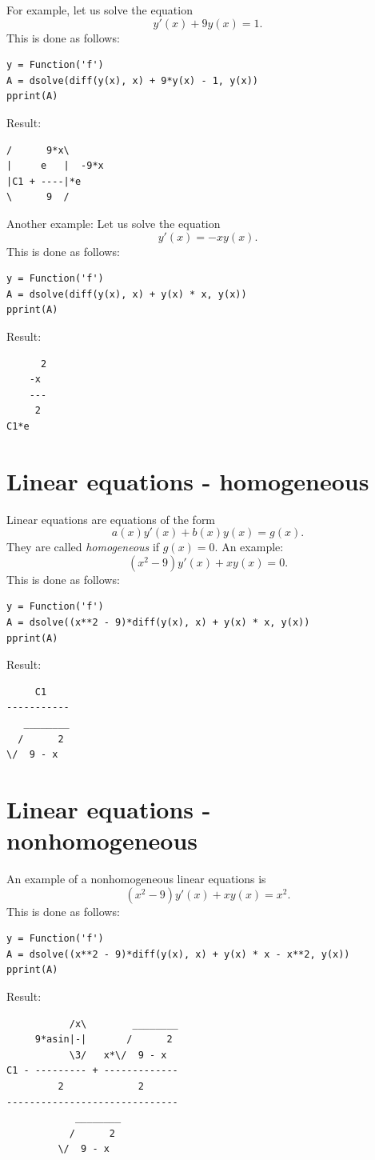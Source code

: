 \documentclass[article,A4,12pt]{llncs}
\begin{document}
For example, let us solve the equation 
$$
  y'(x) + 9y(x) = 1.
$$
This is done as follows:
\begin{verbatim}
y = Function('f')
A = dsolve(diff(y(x), x) + 9*y(x) - 1, y(x))
pprint(A)
\end{verbatim}
Result:
\begin{verbatim}
/      9*x\      
|     e   |  -9*x
|C1 + ----|*e    
\      9  /    
\end{verbatim}
Another example: Let us solve the equation 
$$
  y'(x) = -xy(x).
$$
This is done as follows:
\begin{verbatim}
y = Function('f')
A = dsolve(diff(y(x), x) + y(x) * x, y(x))
pprint(A)
\end{verbatim}
Result:
\begin{verbatim}
      2
    -x 
    ---
     2 
C1*e   
\end{verbatim}

\section{Linear equations - homogeneous}
Linear equations are equations of the form 
$$
a(x) y'(x) + b(x) y(x) = g(x).
$$ 
They are called {\em homogeneous} if $g(x) = 0$.
An example:
$$
(x^2 - 9) y'(x) + x y(x) = 0.
$$
This is done as follows:
\begin{verbatim}
y = Function('f')
A = dsolve((x**2 - 9)*diff(y(x), x) + y(x) * x, y(x))
pprint(A)
\end{verbatim}
Result:
\begin{verbatim}
     C1    
-----------
   ________
  /      2 
\/  9 - x  
\end{verbatim}

\section{Linear equations - nonhomogeneous}

An example of a nonhomogeneous linear equations is
$$
(x^2 - 9) y'(x) + x y(x) = x^2.
$$
This is done as follows:
\begin{verbatim}
y = Function('f')
A = dsolve((x**2 - 9)*diff(y(x), x) + y(x) * x - x**2, y(x))
pprint(A)
\end{verbatim}
Result:
\begin{verbatim}
           /x\        ________
     9*asin|-|       /      2 
           \3/   x*\/  9 - x  
C1 - --------- + -------------
         2             2      
------------------------------
            ________          
           /      2           
         \/  9 - x            
\end{verbatim}
\end{document}
